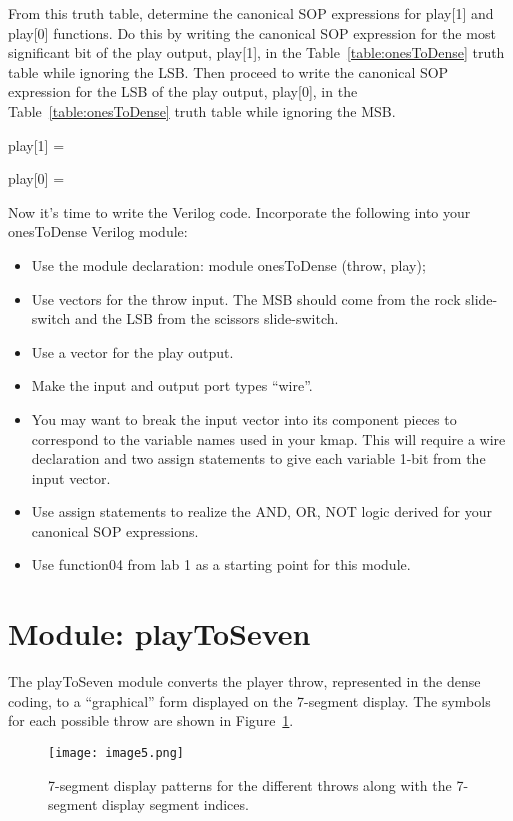 From this truth table, determine the canonical SOP expressions for
play{[}1{]} and play{[}0{]} functions. Do this by writing the canonical
SOP expression for the most significant bit of the play output,
play{[}1{]}, in the Table~\ref{table:onesToDense} truth table while ignoring the LSB. Then
proceed to write the canonical SOP expression for the LSB of the play
output, play{[}0{]}, in the Table~\ref{table:onesToDense} truth table while ignoring the MSB.

\protect\hypertarget{ones2Dense_CanonicalSOP}{}{}play{[}1{]} =

play{[}0{]} =

\protect\hypertarget{ones2Dense_Verilog}{}{}Now it's time to write the
Verilog code. Incorporate the following into your onesToDense Verilog
module:

\begin{itemize}
\item
  Use the module declaration: module onesToDense (throw, play);
\item
  Use vectors for the throw input. The MSB should come from the rock
  slide-switch and the LSB from the scissors slide-switch.
\item
  Use a vector for the play output.
\item
  Make the input and output port types ``wire''.
\item
  You may want to break the input vector into its component pieces to
  correspond to the variable names used in your kmap. This will require
  a wire declaration and two assign statements to give each variable
  1-bit from the input vector.
\item
  Use assign statements to realize the AND, OR, NOT logic derived for
  your canonical SOP expressions.
\item
  Use function04 from lab 1 as a starting point for this module.
\end{itemize}

\hypertarget{playtoseven-module}{%
\section{Module: playToSeven}
\label{playtoseven-module}}

The playToSeven module converts the player throw, represented in the
dense coding, to a ``graphical'' form displayed on the 7-segment
display. The symbols for each possible throw are shown in Figure~\ref{figure:throw7seg}.

\begin{figure}[ht]
\texttt{[image:  image5.png]}
\caption{7-segment display patterns for the different throws along with
the 7-segment display segment indices.}
\label{figure:throw7seg}
\end{figure}

